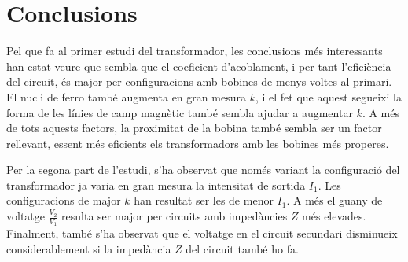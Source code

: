 \section{Conclusions}
Pel que fa al primer estudi del transformador, les conclusions més interessants han estat veure que sembla que el coeficient d'acoblament, i per tant l'eficiència del circuit, és major per configuracions amb bobines de menys voltes al primari. El nucli de ferro també augmenta en gran mesura $k$, i el fet que aquest segueixi la forma de les línies de camp magnètic també sembla ajudar a augmentar $k$. A més de tots aquests factors, la proximitat de la bobina també sembla ser un factor rellevant, essent més eficients els transformadors amb les bobines més properes.

Per la segona part de l'estudi, s'ha observat que només variant la configuració del transformador ja varia en gran mesura la intensitat de sortida $I_1$. Les configuracions de major $k$ han resultat ser les de menor $I_1$. A més el guany de voltatge $\frac{V_2}{V_1}$ resulta ser major per circuits amb impedàncies $Z$ més elevades. Finalment, també s'ha observat que el voltatge en el circuit secundari disminueix considerablement si la impedància $Z$ del circuit també ho fa.
